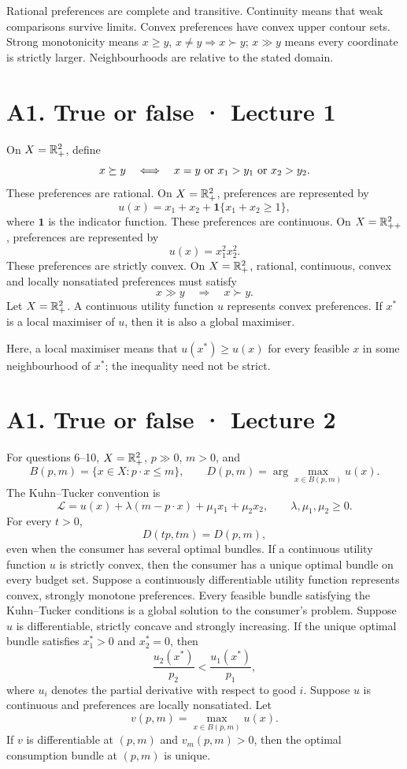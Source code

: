 Rational preferences are complete and transitive. Continuity means that weak comparisons survive limits. Convex preferences have convex upper contour sets. Strong monotonicity means $x\ge y$, $x\ne y\Rightarrow x\succ y$; $x\gg y$ means every coordinate is strictly larger. Neighbourhoods are relative to the stated domain.
\section*{A1. True or false · Lecture 1}
On $X=\mathbb R_+^2$, define
\[
 x\succeq y\quad\Longleftrightarrow\quad
 x=y\ \text{or}\ x_1>y_1\ \text{or}\ x_2>y_2.
\]
These preferences are rational.
On $X=\mathbb R_+^2$, preferences are represented by
\[
 u(x)=x_1+x_2+\mathbf1\{x_1+x_2\ge1\},
\]
where $\mathbf1$ is the indicator function. These preferences are continuous.
On $X=\mathbb R_{++}^2$, preferences are represented by
\[
 u(x)=x_1^2x_2^2.
\]
These preferences are strictly convex.
On $X=\mathbb R_+^2$, rational, continuous, convex and locally nonsatiated preferences must satisfy
\[
 x\gg y\quad\Rightarrow\quad x\succ y.
\]
Let $X=\mathbb R_+^2$. A continuous utility function $u$ represents convex preferences. If $x^*$ is a local maximiser of $u$, then it is also a global maximiser.

Here, a local maximiser means that $u(x^*)\ge u(x)$ for every feasible $x$ in some neighbourhood of $x^*$; the inequality need not be strict.
\clearpage
\section*{A1. True or false · Lecture 2}
For questions 6--10, $X=\mathbb R_+^2$, $p\gg0$, $m>0$, and
\[
 B(p,m)=\{x\in X:p\cdot x\le m\},\qquad
 D(p,m)=\arg\max_{x\in B(p,m)}u(x).
\]
The Kuhn--Tucker convention is
\[
 \mathcal L=u(x)+\lambda(m-p\cdot x)+\mu_1x_1+\mu_2x_2,
 \qquad\lambda,\mu_1,\mu_2\ge0.
\]
For every $t>0$,
\[
 D(tp,tm)=D(p,m),
\]
even when the consumer has several optimal bundles.
If a continuous utility function $u$ is strictly convex, then the consumer has a unique optimal bundle on every budget set.
Suppose a continuously differentiable utility function represents convex, strongly monotone preferences. Every feasible bundle satisfying the Kuhn--Tucker conditions is a global solution to the consumer's problem.
Suppose $u$ is differentiable, strictly concave and strongly increasing. If the unique optimal bundle satisfies $x_1^*>0$ and $x_2^*=0$, then
\[
 \frac{u_2(x^*)}{p_2}<\frac{u_1(x^*)}{p_1},
\]
where $u_i$ denotes the partial derivative with respect to good $i$.
Suppose $u$ is continuous and preferences are locally nonsatiated. Let
\[
 v(p,m)=\max_{x\in B(p,m)}u(x).
\]
If $v$ is differentiable at $(p,m)$ and $v_m(p,m)>0$, then the optimal consumption bundle at $(p,m)$ is unique.
